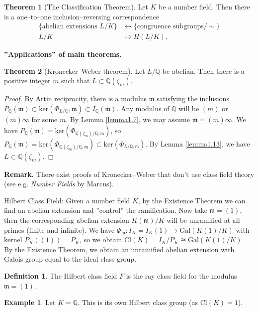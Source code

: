 \documentclass{article}
\theoremstyle{definition}
\newtheorem{theorem}{Theorem}[section]
\newtheorem{example}{Example}[section]
\newtheorem{defn}{Definition}[section]
\begin{document}
\begin{theorem}[The Classification Theorem]
    Let $K$ be a number field. Then there is a one--to--one inclusion--reversing correspondence 
    \begin{align*}
        \{\text{abelian extensions }L/K\} &\leftrightarrow \{\text{congruence subgroups}/\sim\}\\
        L/K &\mapsto H(L/K).
    \end{align*}
\end{theorem}
\textbf{''Applications'' of main theorems.}
\vspace{1mm}
 
\begin{theorem}[Kronecker--Weber theorem]
    Let $L/\mathbb{Q}$ be abelian. Then there is a positive integer $m$ such that $L \subset \mathbb{Q}(\zeta_m)$.
\end{theorem}
\begin{proof}
    By Artin reciprocity, there is a modulus $\mathfrak{m}$ satisfying the inclusions $P_{\mathbb{Q}}(\mathfrak{m}) \subset \text{ker}(\Phi_{L/\mathbb{Q}},\mathfrak{m}) \subset I_\mathbb{Q}(\mathfrak{m})$. Any modulus of $\mathbb{Q}$ will be $(m)$ or $(m)\infty$ for some $m$. By Lemma \ref{lemma1.7}, we may assume $\mathfrak{m} = (m)\infty$. We have $P_{\mathbb{Q}}(\mathfrak{m}) = \text{ker}(\Phi_{\mathbb{Q}(\zeta_m)/\mathbb{Q},\mathfrak{m}})$, so $P_{\mathbb{Q}}(\mathfrak{m}) = \text{ker}(\Phi_{\mathbb{Q}(\zeta_m)/\mathbb{Q},\mathfrak{m}}) \subset \text{ker}(\Phi_{L/\mathbb{Q},\mathfrak{m}})$. By Lemma \ref{lemma1.13}, we have $L \subset \mathbb{Q}(\zeta_m)$.
\end{proof}
\textbf{Remark.} There exist proofs of Kronecker--Weber that don't use class field theory (see e.g. \textit{Number Fields} by Marcus).
\vspace{1mm}
 
Hilbert Class Field: Given a number field $K$, by the Existence Theorem we can find an abelian extension and ''control'' the ramification. Now take $\mathfrak{m} = (1)$, then the corresponding abelian extension $K(\mathfrak{m})/K$ will be unramified at all primes (finite and infinite). We have $\Phi_{\mathfrak{m}}: I_K = I_K(1) \to \text{Gal}(K(1)/K)$ with kernel $P_K((1)) = P_K$, so we obtain $\text{Cl}(K) = I_K/P_K \cong \text{Gal}(K(1)/K)$. By the Existence Theorem, we obtain an unramified abelian extension with Galois group equal to the ideal class group. 
\begin{defn}
    The Hilbert class field $F$ is the ray class field for the modulus $\mathfrak{m}=(1)$.
\end{defn}
\begin{example}
    Let $K=\mathbb{Q}$. This is its own Hilbert class group (as $\text{Cl}(K)=1$).
\end{example}
\end{document}
